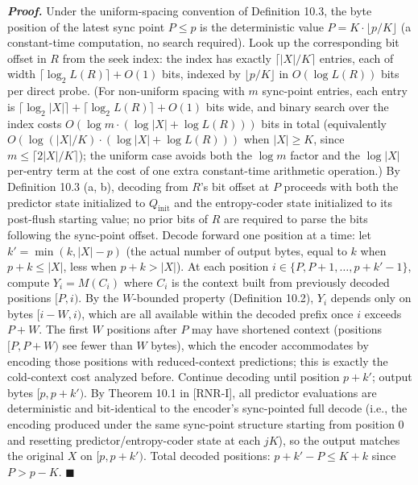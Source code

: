 \documentclass[
]{article}
\begin{document}
\emph{\textbf{Proof.}} Under the uniform-spacing convention of
Definition 10.3, the byte position of the latest sync point
$P \leq p$ is the deterministic value $P = K \cdot \lfloor p/K \rfloor$
(a constant-time computation, no search required). Look up the
corresponding bit offset in $R$ from the seek index: the index has
exactly $\lceil |X|/K \rceil$ entries, each of width
$\lceil \log_2 L(R)\rceil + O(1)$ bits, indexed by $\lfloor p/K \rfloor$
in $O(\log L(R))$ bits per direct probe. (For non-uniform spacing
with $m$ sync-point entries, each entry is
$\lceil \log_2|X|\rceil + \lceil \log_2 L(R)\rceil + O(1)$
bits wide, and binary search over the index costs
$O(\log m \cdot (\log |X| + \log L(R)))$ bits in total
(equivalently $O(\log(|X|/K) \cdot (\log |X| + \log L(R)))$ when
$|X| \geq K$, since $m \leq \lceil 2|X|/K \rceil$); the
uniform case avoids both the $\log m$ factor and the
$\log |X|$ per-entry term at the cost of one extra constant-time
arithmetic operation.) By
Definition 10.3 (a, b), decoding from $R$'s bit offset at $P$
proceeds with both the predictor state initialized to
$Q_{\text{init}}$ and the entropy-coder state initialized to its
post-flush starting value; no prior bits of $R$ are required to
parse the bits following the sync-point offset. Decode forward one
position at a time: let $k' = \min(k, |X| - p)$ (the actual number
of output bytes, equal to $k$ when $p + k \leq |X|$, less when
$p + k > |X|$). At each position $i \in \{P, P+1, \ldots, p+k'-1\}$,
compute $Y_i = M(C_i)$ where $C_i$ is the context built from
previously decoded positions $[P, i)$. By the $W$-bounded property
(Definition 10.2), $Y_i$ depends only on bytes $[i-W, i)$, which are
all available within the decoded prefix once $i$ exceeds $P + W$. The
first $W$ positions after $P$ may have shortened context (positions
$[P, P+W)$ see fewer than $W$ bytes), which the encoder accommodates
by encoding those positions with reduced-context predictions; this is
exactly the cold-context cost analyzed before. Continue decoding
until position $p + k'$; output bytes $[p, p+k')$. By Theorem 10.1 in [RNR-I],
all predictor evaluations are deterministic and bit-identical to
the encoder's sync-pointed full decode (i.e., the encoding produced
under the same sync-point structure starting from position 0 and
resetting predictor/entropy-coder state at each $jK$), so the
output matches the original $X$ on $[p, p+k')$. Total decoded
positions: $p + k' - P \leq K + k$ since $P > p - K$.
\hfill$\blacksquare$
\end{document}
